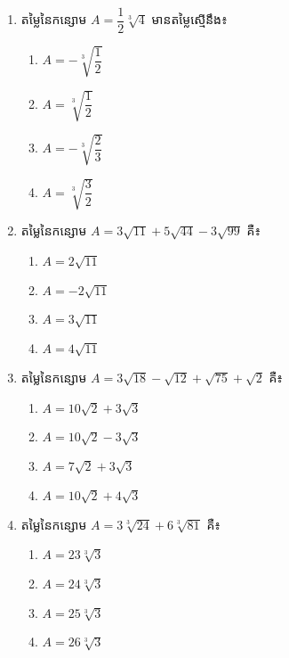\begin{enumerate}
\item តម្លៃនៃកន្សោម $A=\dfrac{1}{2}\sqrt[3]{4}$ មានតម្លៃស្មើនឹង៖
\begin{multicols}{4}
\begin{enumerate}[label=\alph*.]
	\item $A=-\sqrt[3]{\dfrac{1}{2}}$
	\item $A=\sqrt[3]{\dfrac{1}{2}}$
	\item $A=-\sqrt[3]{\dfrac{2}{3}}$
	\item $A=\sqrt[3]{\dfrac{3}{2}}$
\end{enumerate}
\end{multicols}

\item តម្លៃនៃកន្សោម $A=3\sqrt{11}+5\sqrt{44}-3\sqrt{99}$ គឺ៖
\begin{multicols}{4}
\begin{enumerate}[label=\alph*.]
	\item $A=2\sqrt{11}$
	\item $A=-2\sqrt{11}$
	\item $A=3\sqrt{11}$
	\item $A=4\sqrt{11}$	
\end{enumerate}
\end{multicols}

\item តម្លៃនៃកន្សោម $A=3\sqrt{18}-\sqrt{12}+\sqrt{75}+\sqrt{2}$ គឺ៖
\begin{multicols}{2}
\begin{enumerate}[label=\alph*.]
	\item $A=10\sqrt{2}+3\sqrt{3}$
	\item $A=10\sqrt{2}-3\sqrt{3}$
	\item $A=7\sqrt{2}+3\sqrt{3}$
	\item $A=10\sqrt{2}+4\sqrt{3}$
\end{enumerate}
\end{multicols}

\item តម្លៃនៃកន្សោម $A=3\sqrt[3]{24}+6\sqrt[3]{81}$ គឺ៖
\begin{multicols}{4}
\begin{enumerate}[label=\alph*.]
	\item $A=23\sqrt[3]{3}$
	\item $A=24\sqrt[3]{3}$
	\item $A=25\sqrt[3]{3}$
	\item $A=26\sqrt[3]{3}$	
\end{enumerate}
\end{multicols}


\end{enumerate}
